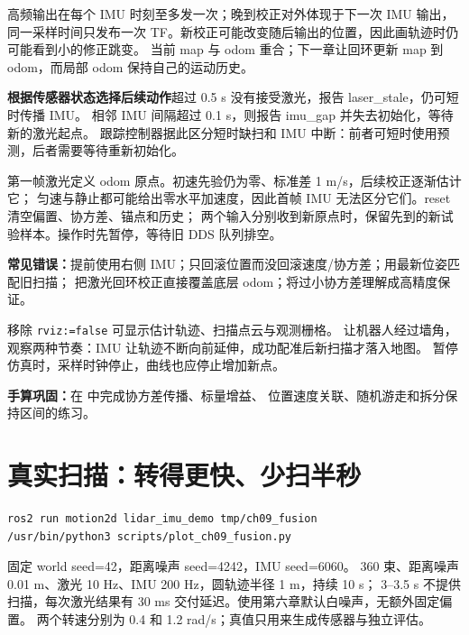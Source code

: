 高频输出在每个 IMU 时刻至多发一次；晚到校正对外体现于下一次 IMU 输出，
同一采样时间只发布一次 TF。新校正可能改变随后输出的位置，因此画轨迹时仍可能看到小的修正跳变。
当前 map 与 odom 重合；下一章让回环更新 map 到 odom，而局部 odom 保持自己的运动历史。

\begin{notebox}
\textbf{根据传感器状态选择后续动作}\quad 超过 0.5 s 没有接受激光，报告 laser\_stale，仍可短时传播 IMU。
相邻 IMU 间隔超过 0.1 s，则报告 imu\_gap 并失去初始化，等待新的激光起点。
跟踪控制器据此区分短时缺扫和 IMU 中断：前者可短时使用预测，后者需要等待重新初始化。
\end{notebox}

第一帧激光定义 odom 原点。初速先验仍为零、标准差 1 m/s，后续校正逐渐估计它；
匀速与静止都可能给出零水平加速度，因此首帧 IMU 无法区分它们。reset 清空偏置、协方差、锚点和历史；
两个输入分别收到新原点时，保留先到的新试验样本。操作时先暂停，等待旧 DDS 队列排空。

\textbf{常见错误：}提前使用右侧 IMU；只回滚位置而没回滚速度/协方差；用最新位姿匹配旧扫描；
把激光回环校正直接覆盖底层 odom；将过小协方差理解成高精度保证。

移除 \texttt{rviz:=false} 可显示估计轨迹、扫描点云与观测栅格。
让机器人经过墙角，观察两种节奏：IMU 让轨迹不断向前延伸，成功配准后新扫描才落入地图。
暂停仿真时，采样时钟停止，曲线也应停止增加新点。

\textbf{手算巩固：}在  中完成协方差传播、标量增益、
位置速度关联、随机游走和拆分保持区间的练习。

\clearpage
\section{真实扫描：转得更快、少扫半秒}
\begin{lstlisting}[language=bash]
ros2 run motion2d lidar_imu_demo tmp/ch09_fusion
/usr/bin/python3 scripts/plot_ch09_fusion.py
\end{lstlisting}
固定 world seed=42，距离噪声 seed=4242，IMU seed=6060。
360 束、距离噪声 0.01 m、激光 10 Hz、IMU 200 Hz，圆轨迹半径 1 m，持续 10 s；
3--3.5 s 不提供扫描，每次激光结果有 30 ms 交付延迟。使用第六章默认白噪声，无额外固定偏置。
两个转速分别为 0.4 和 1.2 rad/s；真值只用来生成传感器与独立评估。

